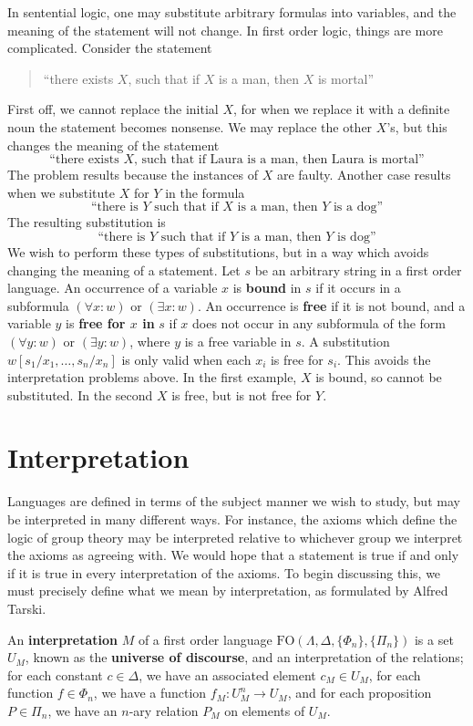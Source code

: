 In sentential logic, one may substitute arbitrary formulas into variables, and the meaning of the statement will not change. In first order logic, things are more complicated. Consider the statement
%
\begin{quotation}
    ``there exists $X$, such that if $X$ is a man, then $X$ is mortal''
\end{quotation}
%
First off, we cannot replace the initial $X$, for when we replace it with a definite noun the statement becomes nonsense. We may replace the other $X$'s, but this changes the meaning of the statement
%
\[ \text{``there exists $X$, such that if Laura is a man, then Laura is mortal''} \]
%
The problem results because the instances of $X$ are faulty. Another case results when we substitute $X$ for $Y$ in the formula
%
\[ \text{``there is $Y$ such that if $X$ is a man, then $Y$ is a dog''} \]
%
The resulting substitution is
%
\[ \text{``there is $Y$ such that if $Y$ is a man, then $Y$ is dog''} \]
%
We wish to perform these types of substitutions, but in a way which avoids changing the meaning of a statement. Let $s$ be an arbitrary string in a first order language. An occurrence of a variable $x$ is {\bf bound} in $s$ if it occurs in a subformula $(\forall x: w)$ or $(\exists x: w)$. An occurrence is {\bf free} if it is not bound, and a variable $y$ is {\bf free for $x$ in} $s$ if $x$ does not occur in any subformula of the form $(\forall y: w)$ or $(\exists y: w)$, where $y$ is a free variable in $s$. A substitution $w[s_1/x_1, \dots, s_n/x_n]$ is only valid when each $x_i$ is free for $s_i$. This avoids the interpretation problems above. In the first example, $X$ is bound, so cannot be substituted. In the second $X$ is free, but is not free for $Y$.

\section{Interpretation}

Languages are defined in terms of the subject manner we wish to study, but may be interpreted in many different ways. For instance, the axioms which define the logic of group theory may be interpreted relative to whichever group we interpret the axioms as agreeing with. We would hope that a statement is true if and only if it is true in every interpretation of the axioms. To begin discussing this, we must precisely define what we mean by interpretation, as formulated by Alfred Tarski.

An {\bf interpretation} $M$ of a first order language $\text{FO}(\Lambda, \Delta, \{ \Phi_n \}, \{ \Pi_n \})$ is a set $U_M$, known as the {\bf universe of discourse}, and an interpretation of the relations; for each constant $c \in \Delta$, we have an associated element $c_M \in U_M$, for each function $f \in \Phi_n$, we have a function $f_M: U_M^n \to U_M$, and for each proposition $P \in \Pi_n$, we have an $n$-ary relation $P_M$ on elements of $U_M$.


